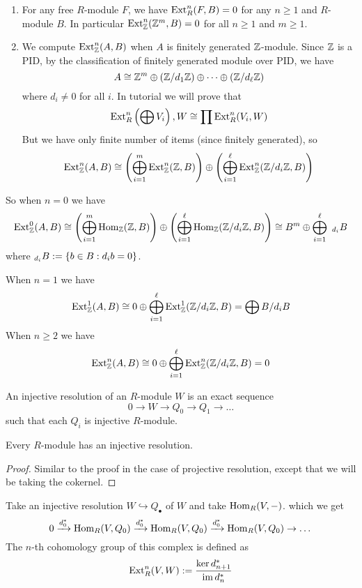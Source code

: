 \begin{ex}
    \hfill
    
    \begin{enumerate}
        \item For any free $R$-module $F$, we have $\operatorname{Ext}_R^n(F,B)=0$ for any $n\geq 1$ and $R$-module $B$. In particular $\operatorname{Ext}_{\mathbb Z}^n({\mathbb Z}^m,B)=0$ for all $n\geq 1$ and $m\geq 1$.
        \item We compute $\operatorname{Ext}_{\mathbb Z}^n(A,B)$ when $A$ is finitely generated ${\mathbb Z}$-module. Since ${\mathbb Z}$ is a PID, by the classification of finitely generated module over PID, we have 
        \[A\cong {\mathbb Z}^m \oplus ({\mathbb Z}/d_1{\mathbb Z}) \oplus \dots \oplus ({\mathbb Z}/d_\ell {\mathbb Z}) \]
        where $d_i\neq 0 $ for all $i$. In tutorial we will prove that
        \[\operatorname{Ext}_R^n\left(\bigoplus V_i\right), W\cong \prod \operatorname{Ext}_R^n(V_i, W)\]
        But we have only finite number of items (since finitely generated), so 
        \[\operatorname{Ext}_{\mathbb Z}^n(A,B)\cong \left(\bigoplus_{i=1}^m \operatorname{Ext}_{\mathbb Z}^n({\mathbb Z},B)\right) \oplus \left(\bigoplus_{i=1}^\ell\operatorname{Ext}_{\mathbb Z}^n({\mathbb Z}/d_i{\mathbb Z}, B)\right)\]
    \end{enumerate}
    So when $n=0$ we have
    \[\operatorname{Ext}_{\mathbb Z}^0(A,B) \cong \left(\bigoplus_{i=1}^m \operatorname{Hom}_{\mathbb Z}({\mathbb Z},B)\right) \oplus \left(\bigoplus_{i=1}^\ell\operatorname{Hom}_{\mathbb Z}({\mathbb Z}/d_i{\mathbb Z}, B)\right)\cong B^m \oplus  \bigoplus_{i=1}^\ell\ _{d_i}B\]
    where $_{d_i}B:= \left\{b\in B : d_i b = 0\right\}$.

    When $n=1$ we have
    \[\operatorname{Ext}_{\mathbb Z}^1(A,B) \cong 0 \oplus \bigoplus_{i=1}^\ell \operatorname{Ext}_{\mathbb Z}^1 ({\mathbb Z}/d_i{\mathbb Z}, B) = \bigoplus B/d_i B\]
    When $n\geq 2$ we have 
    \[\operatorname{Ext}_{\mathbb Z}^n(A,B)\cong 0 \oplus \bigoplus_{i=1}^\ell \operatorname{Ext}_{\mathbb Z}^n({\mathbb Z}/d_i{\mathbb Z}, B) = 0\]
\end{ex}

\medskip

\begin{defn} 
    An injective resolution of an $R$-module $W$ is an exact sequence 
    \[0 \to W \to Q_0 \to Q_1 \to \dots\]
    such that each $Q_i$ is injective $R$-module.
\end{defn}

\medskip

\begin{pro}
    Every $R$-module has an injective resolution.
\end{pro}
\begin{proof}
    Similar to the proof in the case of projective resolution, except that we will be taking the cokernel.
\end{proof}

\begin{defn} 
    Take an injective resolution $W\hookrightarrow Q_\bullet$ of $W$ and take $\operatorname{Hom}_R(V,-)$. which we get 
    \[0 \xrightarrow{d_0^*} \operatorname{Hom}_R(V,Q_0) \xrightarrow{d_0^*} \operatorname{Hom}_R(V,Q_0) \xrightarrow{d_0^*} \operatorname{Hom}_R(V,Q_0) \to \dots \]
    The $n$-th cohomology group of this complex is defined as 
    \[\operatorname{Ext}_R^n(V,W) := \frac{\ker d_{n+1}^*}{\operatorname{im} d_n^*}\]
\end{defn}

